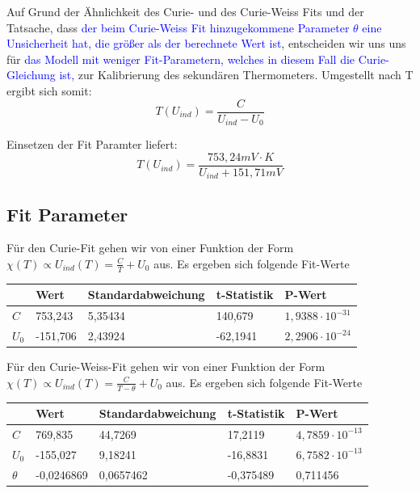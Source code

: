 \documentclass[bigchapter,colorback,accentcolor=tud4b,linedtoc,11pt]{tudreport}
\begin{document}
Auf Grund der Ähnlichkeit des Curie- und des Curie-Weiss Fits und der Tatsache,
dass \textcolor{blue}{der beim Curie-Weiss Fit hinzugekommene Parameter $\theta$
eine Unsicherheit hat, die größer als der berechnete Wert ist}, entscheiden wir
uns uns für \textcolor{blue}{das Modell mit weniger Fit-Parametern, welches in
  diesem Fall die Curie-Gleichung ist,} zur Kalibrierung des sekundären
Thermometers. Umgestellt nach T ergibt sich somit:
$$T(U_{ind}) = \frac{C}{U_{ind}-U_0}$$ 

Einsetzen der Fit Paramter liefert:
$$T(U_{ind}) = \frac{753,24mV \cdot K}{U_{ind}+151,71mV}$$ 


\subsection{Fit Parameter}
Für den Curie-Fit gehen wir von einer Funktion der Form $\chi(T) \propto U_{ind}(T)
= \frac{C}{T} + U_0$ aus.
Es ergeben sich folgende Fit-Werte
\begin{center}
  \begin{tabular}{l|llll}
    \text{} & Wert     & Standardabweichung & t-Statistik & P-Wert                  \\ \hline
    $C  $   & 753,243  & 5,35434            & 140,679     & $1,9388 \cdot 10^{-31}$ \\
    $U_0$   & -151,706 & 2,43924            & -62,1941    & $2,2906 \cdot 10^{-24}$ \\
  \end{tabular}
\end{center}


Für den Curie-Weiss-Fit gehen wir von einer Funktion der Form $\chi(T) \propto
U_{ind}(T) = \frac{C}{T-\theta} + U_0$ aus.
Es ergeben sich folgende Fit-Werte
\begin{center}
  \begin{tabular}{l|llll}
             & Wert       & Standardabweichung & t-Statistik & P-Wert                  \\ \hline
    $C     $ & 769,835    & 44,7269            & 17,2119     & $4,7859 \cdot 10^{-13}$ \\
    $U_0   $ & -155,027   & 9,18241            & -16,8831    & $6,7582 \cdot 10^{-13}$ \\
    $\theta$ & -0,0246869 & 0,0657462          & -0,375489   & 0,711456                \\
  \end{tabular}
\end{center}
\end{document}
